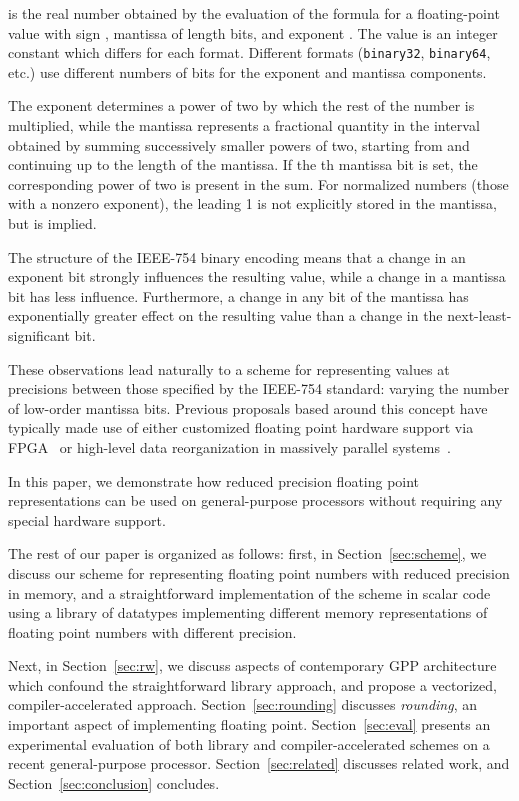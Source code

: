 \documentclass{sig-alternate-05-2015}
\newcommand{\mt}[1]{\texttt{#1}}
\begin{document}
\noindent  is the real number obtained by the evaluation of the formula for
a floating-point value with sign , mantissa  of length  bits, and
exponent . The value  is an integer constant which differs for each
format. Different formats (\mt{binary32}, \mt{binary64}, etc.) use different
numbers of bits for the exponent and mantissa components.

The exponent determines a power of two by which the rest of the number is
multiplied, while the mantissa represents a fractional quantity in the interval
 obtained by summing successively smaller powers of two, starting from
 and continuing up to the length of the mantissa. If the th mantissa
bit is set, the corresponding power of two is present in the sum. For
normalized numbers (those with a nonzero exponent), the leading 1 is not
explicitly stored in the mantissa, but is implied.

The structure of the IEEE-754 binary encoding means that a change in an
exponent bit strongly influences the resulting value, while a change in a
mantissa bit has less influence. Furthermore, a change in any bit of the
mantissa has exponentially greater effect on the resulting value than a change
in the next-least-significant bit.

These observations lead naturally to a scheme for representing values at
precisions between those specified by the IEEE-754 standard: varying the number
of low-order mantissa bits. Previous proposals based around this concept have
typically made use of either customized floating point hardware support via
FPGA~\cite{de2009generating} or high-level data reorganization in massively
parallel systems~\cite{jenkins2012byte}.

In this paper, we demonstrate how reduced precision floating point
representations can be used on general-purpose processors without requiring any
special hardware support.

The rest of our paper is organized as follows: first, in
Section~\ref{sec:scheme}, we discuss our scheme for representing floating point
numbers with reduced precision in memory, and a straightforward implementation
of the scheme in scalar code using a library of datatypes implementing
different memory representations of floating point numbers with different
precision.

Next, in Section~\ref{sec:rw}, we discuss aspects of contemporary GPP
architecture which confound the straightforward library approach, and propose a
vectorized, compiler-accelerated approach. Section~\ref{sec:rounding} discusses
\emph{rounding}, an important aspect of implementing floating point.
Section~\ref{sec:eval} presents an experimental evaluation of both library and
compiler-accelerated schemes on a recent general-purpose processor.
Section~\ref{sec:related} discusses related work, and
Section~\ref{sec:conclusion} concludes.
\end{document}
